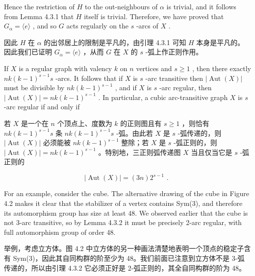 \documentclass[10pt]{article}
\begin{document}
Hence the restriction of \(H\) to the out-neighbours of \(\alpha\) is trivial, and it follows from Lemma 4.3.1 that \(H\) itself is trivial. Therefore, we have proved that \({G}_{\alpha } = \langle e\rangle\) , and so \(G\) acts regularly on the \(s\) -arcs of \(X\) .

\begin{tcolorbox}\relax
因此 \(H\) 在 \(\alpha\) 的出邻居上的限制是平凡的，由引理 4.3.1 可知 \(H\) 本身是平凡的。因此我们已证明 \({G}_{\alpha } = \langle e\rangle\) ，从而 \(G\) 在 \(X\) 的 \(s\) -弧上作正则作用。
\end{tcolorbox}

If \(X\) is a regular graph with valency \(k\) on \(n\) vertices and \(s \geq  1\) , then there exactly \({nk}{\left( k - 1\right) }^{s - 1}s\) -arcs. It follows that if \(X\) is \(s\) -arc transitive then \(\left| {\operatorname{Aut}\left( X\right) }\right|\) must be divisible by \({nk}{\left( k - 1\right) }^{s - 1}\) , and if \(X\) is \(s\) -arc regular, then \(\left| {\operatorname{Aut}\left( X\right) }\right|  = {nk}{\left( k - 1\right) }^{s - 1}\) . In particular, a cubic arc-transitive graph \(X\) is \(s\) -arc regular if and only if

\begin{tcolorbox}\relax
若 \(X\) 是一个在 \(n\) 个顶点上、度数为 \(k\) 的正则图且有 \(s \geq  1\) ，则恰有 \({nk}{\left( k - 1\right) }^{s - 1}s\) 条 \({nk}{\left( k - 1\right) }^{s - 1}s\) -弧。由此若 \(X\) 是 \(s\) -弧传递的，则 \(\left| {\operatorname{Aut}\left( X\right) }\right|\) 必须能被 \({nk}{\left( k - 1\right) }^{s - 1}\) 整除；若 \(X\) 是 \(s\) -弧正则的，则 \(\left| {\operatorname{Aut}\left( X\right) }\right|  = {nk}{\left( k - 1\right) }^{s - 1}\) 。特别地，三正则弧传递图 \(X\) 当且仅当它是 \(s\) -弧正则的
\end{tcolorbox}

\[
\left| {\operatorname{Aut}\left( X\right) }\right|  = \left( {3n}\right) {2}^{s - 1}\text{ . }
\]

For an example, consider the cube. The alternative drawing of the cube in Figure 4.2 makes it clear that the stabilizer of a vertex contains Sym(3), and therefore its automorphism group has size at least 48. We observed earlier that the cube is not 3-arc transitive, so by Lemma 4.3.2 it must be precisely 2-arc regular, with full automorphism group of order 48.

\begin{tcolorbox}\relax
举例，考虑立方体。图 4.2 中立方体的另一种画法清楚地表明一个顶点的稳定子含有 Sym(3)，因此其自同构群的阶至少为 48。我们前面已注意到立方体不是 3-弧传递的，所以由引理 4.3.2 它必须正好是 2-弧正则的，其全自同构群的阶为 48。
\end{tcolorbox}
\end{document}
